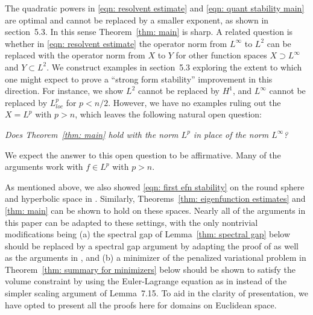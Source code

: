 \documentclass[10pt,a4paper]{amsart}
\numberwithin{equation}{section}
\providecommand{\href}[2]{#2}
\begin{document}
 

The quadratic powers in \eqref{eqn: resolvent estimate} and \eqref{eqn: quant stability main} are optimal and cannot be replaced by a smaller exponent, as shown in section~\href{https://arxiv.org/abs/2504.13053v2}{5.3}. In this sense Theorem~\ref{thm: main} is sharp. A related question is whether in \eqref{eqn: resolvent estimate} the operator norm from $L^{\infty}$ to $L^2$ can be replaced with  the operator norm from $X$ to $Y$ for other function spaces $X\supset L^{\infty}$ and $Y \subset L^2$. We construct examples in section~\href{https://arxiv.org/abs/2504.13053v2}{5.3} exploring the extent to which one might expect to prove a ``strong form stability'' improvement in this direction. For instance, we show $L^2$ cannot be replaced by $H^1$, and $L^{\infty}$ cannot be replaced by $L^p_{loc}$ for $p<n/2.$ However, we have no examples ruling out the $X= L^p$ with $p>n$, which leaves the following natural open question:
\smallskip

 {\it Does Theorem~\ref{thm: main} hold with the norm $L^p$ in place of the norm  $L^{\infty}$?
}

\smallskip
 We expect the answer to this open question to be affirmative. Many of the arguments work with $f \in L^p$ with $p>n$. 


As mentioned above, we also showed \eqref{eqn: first efn stability} on the round sphere and hyperbolic space in \cite{AKN1, AKN2}. Similarly, Theorems~\ref{thm: eigenfunction estimates} and \ref{thm: main} can be shown to hold on these spaces. Nearly  all of the arguments in this paper can be adapted to these settings, with the only nontrivial modifications being (a) the spectral gap of Lemma~\ref{thm: spectral gap} below should be replaced by a spectral gap argument by adapting the proof of \cite[Theorem 3.11]{AKN1} as well as the arguments in \cite{p24}, and (b) a minimizer of the penalized variational problem in Theorem~\ref{thm: summary for minimizers} below should be shown to satisfy the volume constraint by using the Euler-Lagrange equation as in \cite[Proposition 9.5]{AKN2} instead of the simpler scaling argument of Lemma~\href{https://arxiv.org/abs/2504.13053v2}{7.15}. To aid in the clarity of presentation, we have opted to present all the proofs here for domains on Euclidean space.

\label{thm: spectral gap (stray introduction occurrence)}
\end{document}
